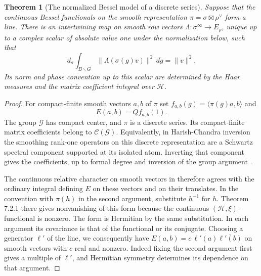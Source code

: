 \documentclass[a4paper,11pt]{article}
\newtheorem{theorem}[proposition]{Theorem}
\theoremstyle{definition}
\theoremstyle{remark}
\numberwithin{equation}{section}
\begin{document}
\begin{theorem}[The normalized Bessel model of a discrete series]
\label{thm:rel155}
Suppose that the continuous Bessel functionals on the smooth
representation \(\pi=\sigma\boxtimes\rho^\vee\) form a line.
There is an intertwining map on smooth row vectors
\(\Lambda:\sigma^\infty\to E_\rho\), unique up to a complex
scalar of absolute value one under the normalization below,
such that
\begin{equation}
  d_\sigma\int_{B\backslash G}\!
        \|\Lambda(\sigma(g)v)\|^2\,d\dot g=\|v\|^2 .
  \label{eq:isom155}
\end{equation}
Its norm and phase convention up to this scalar are determined
by the Haar measures and the matrix coefficient integral
over \(\mathcal H\).
\end{theorem}
\begin{proof}
For compact-finite smooth vectors \(a,b\) of \(\pi\) set
\(f_{a,b}(g)=\langle\pi(g)a,b\rangle\) and
\[
           E(a,b)=Qf_{a,b}(1).
\]
The group \(\mathcal G\) has compact center, and \(\pi\)
is a discrete series. Its compact-finite matrix coefficients
belong to \(\mathcal C(\mathcal G)\). Equivalently, in
Harish-Chandra inversion the smoothing rank-one operators on
this discrete representation are a Schwartz spectral component
supported at its isolated atom. Inverting that component gives
the coefficients, up to formal degree and inversion of the
group argument \cite[Theorem 2.6.1]{XX-XV-IV-bp155}.

The continuous relative character on smooth vectors in
\cite[Sections 7.1--7.2]{XX-XV-IV-bp155} therefore agrees with the
ordinary integral defining \(E\) on these vectors and on their
translates. In the convention with \(\pi(h)\) in the second
argument, substitute \(h^{-1}\) for \(h\). Theorem 7.2.1
there gives nonvanishing of this form because the continuous
\((\mathcal H,\xi)\)-functional is nonzero. The form is
Hermitian by the same substitution. In each argument its
covariance is that of the functional or its conjugate. Choosing
a generator \(\ell'\) of the line, we consequently have
\(E(a,b)=c\,\ell'(a)\overline{\ell'(b)}\) on smooth vectors
with \(c\) real and nonzero. Indeed fixing the second argument
first gives a multiple of \(\ell'\), and Hermitian symmetry
determines its dependence on that argument.


\end{proof}
\end{document}
